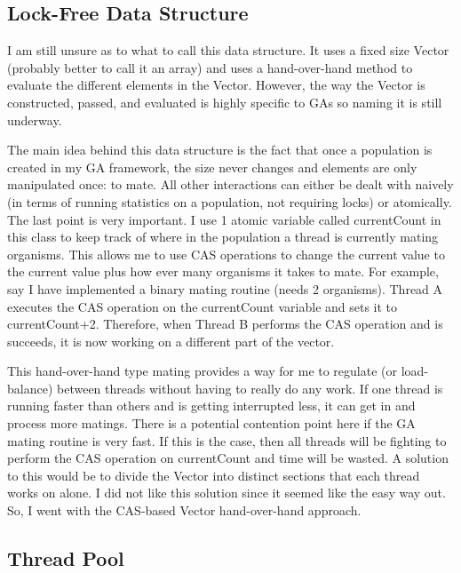 \documentclass{acm_proc_article-sp}
\begin{document}
\subsection{Lock-Free Data Structure}

I am still unsure as to what to call this data structure. It uses a fixed size Vector (probably better to call it an array) and uses a hand-over-hand method to evaluate the different elements in the Vector. However, the way the Vector is constructed, passed, and evaluated is highly specific to GAs so naming it is still underway.

The main idea behind this data structure is the fact that once a population is created in my GA framework, the size never changes and elements are only manipulated once: to mate. All other interactions can either be dealt with naively (in terms of running statistics on a population, not requiring locks) or atomically. The last point is very important. I use 1 atomic variable called currentCount in this class to keep track of where in the population a thread is currently mating organisms. This allows me to use CAS operations to change the current value to the current value plus how ever many organisms it takes to mate. For example, say I have implemented a binary mating routine (needs 2 organisms). Thread A executes the CAS operation on the currentCount variable and sets it to currentCount+2. Therefore, when Thread B performs the CAS operation and is succeeds, it is now working on a different part of the vector. 

This hand-over-hand type mating provides a way for me to regulate (or load-balance) between threads without having to really do any work. If one thread is running faster than others and is getting interrupted less, it can get in and process more matings. There is a potential contention point here if the GA mating routine is very fast. If this is the case, then all threads will be fighting to perform the CAS operation on currentCount and time will be wasted. A solution to this would be to divide the Vector into distinct sections that each thread works on alone. I did not like this solution since it seemed like the easy way out. So, I went with the CAS-based Vector hand-over-hand approach.


\subsection{Thread Pool}
\end{document}
